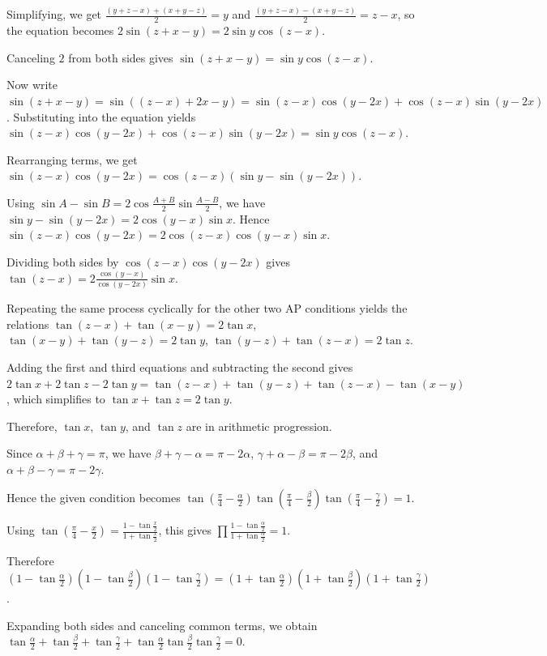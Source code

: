   Simplifying, we get $\frac{(y+z-x)+(x+y-z)}{2}=y$ and $\frac{(y+z-x)-(x+y-z)}{2}=z-x$, so the equation
  becomes $2\sin(z+x-y)=2\sin y \cos(z-x)$.

  Canceling $2$ from both sides gives $\sin(z+x-y)=\sin y \cos(z-x)$.

  Now write $\sin(z+x-y)=\sin((z-x)+2x-y)=\sin(z-x)\cos(y-2x)+\cos(z-x)\sin(y-2x)$. Substituting into the
  equation yields $\sin(z-x)\cos(y-2x)+\cos(z-x)\sin(y-2x)=\sin y \cos(z-x)$.

  Rearranging terms, we get $\sin(z-x)\cos(y-2x)=\cos(z-x)(\sin y-\sin(y-2x))$.

  Using $\sin A-\sin B=2\cos\frac{A+B}{2}\sin\frac{A-B}{2}$, we have $\sin y-\sin(y-2x)=2\cos(y-x)\sin
  x$. Hence $\sin(z-x)\cos(y-2x)=2\cos(z-x)\cos(y-x)\sin x$.

  Dividing both sides by $\cos(z-x)\cos(y-2x)$ gives $\tan(z-x)=2\frac{\cos(y-x)}{\cos(y-2x)}\sin x$.

  Repeating the same process cyclically for the other two AP conditions yields the relations
  $\tan(z-x)+\tan(x-y)=2\tan x$,
  $\tan(x-y)+\tan(y-z)=2\tan y$,
  $\tan(y-z)+\tan(z-x)=2\tan z$.

  Adding the first and third equations and subtracting the second gives
  $2\tan x+2\tan z-2\tan y=\tan(z-x)+\tan(y-z)+\tan(z-x)-\tan(x-y)$, which simplifies to
  $\tan x+\tan z=2\tan y$.

  Therefore, $\tan x$, $\tan y$, and $\tan z$ are in arithmetic progression.
\item Since $\alpha+\beta+\gamma=\pi$, we have $\beta+\gamma-\alpha=\pi-2\alpha$,
  $\gamma+\alpha-\beta=\pi-2\beta$, and $\alpha+\beta-\gamma=\pi-2\gamma$.

  Hence the given condition becomes $\tan\left(\frac{\pi}{4}
  - \frac{\alpha}{2}\right)\tan\left(\frac{\pi}{4} - \frac{\beta}{2}\right)\tan\left(\frac{\pi}{4}
  - \frac{\gamma}{2}\right) = 1$.

  Using $\tan\left(\frac{\pi}{4}-\frac{x}{2}\right) = \frac{1-\tan\frac{x}{2}}{1+\tan\frac{x}{2}}$, this
  gives $\prod \frac{1-\tan\frac{\alpha}{2}}{1+\tan\frac{\alpha}{2}} = 1$.

  Therefore $(1 - \tan\frac{\alpha}{2})(1 - \tan\frac{\beta}{2})(1 - \tan\frac{\gamma}{2}) = (1
  + \tan\frac{\alpha}{2})(1 + \tan\frac{\beta}{2})(1 + \tan\frac{\gamma}{2})$.

  Expanding both sides and canceling common terms, we obtain $\tan\frac{\alpha}{2} + \tan\frac{\beta}{2}
  + \tan\frac{\gamma}{2} + \tan\frac{\alpha}{2}\tan\frac{\beta}{2}\tan\frac{\gamma}{2} = 0$.

